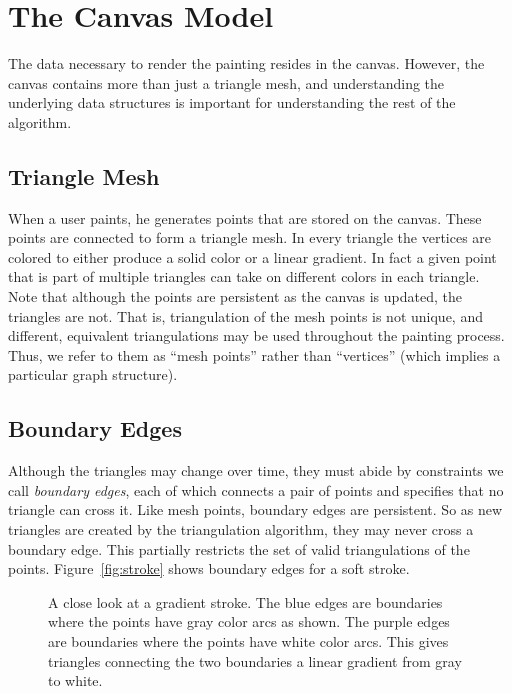 \documentclass[conference]{acmsiggraph}
\begin{document}
\section{The Canvas Model}
The data necessary to render the painting resides in the canvas. However, the canvas contains more than just
a triangle mesh, and understanding the underlying data structures is important for 
understanding the rest of the algorithm.

\subsection{Triangle Mesh}
When a user paints, he generates points that are stored on the canvas. These points are
connected to form a triangle mesh. In every triangle the vertices are colored to either
produce a solid color or a linear gradient. In fact a given point that is part of
multiple triangles can take on different colors in each triangle. Note that although
the points are persistent as the canvas is updated, the triangles are not.  
That is, triangulation of the mesh points is not unique, and different, equivalent triangulations may 
be used throughout the painting process.
Thus, we refer to them as ``mesh points'' rather than ``vertices'' (which implies a particular graph
structure).

\subsection{Boundary Edges}
Although the triangles may change over time, they must abide by constraints we call
\emph{boundary edges}, each of which connects a pair of points and specifies that no triangle
can cross it. Like mesh points, boundary edges are persistent. 
%
So as new triangles are created by the triangulation algorithm, they
may never cross a boundary edge.  
This partially restricts the set of valid triangulations of the points.  Figure~\ref{fig:stroke} shows boundary edges for a soft  stroke.

\begin{figure}[t]
    \centering
    \caption{A close look at a gradient stroke. The blue edges are boundaries where
    the points have gray color arcs as shown. The purple edges are boundaries where
    the points have white color arcs. This gives triangles connecting the two boundaries
    a linear gradient from gray to white.}
    \label{fig:softarcs}
\end{figure}
\end{document}
